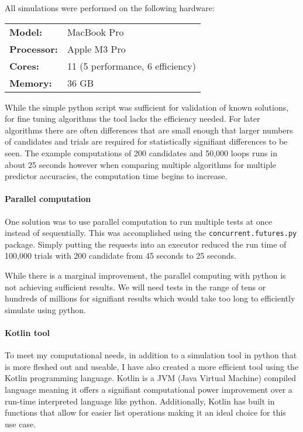 \documentclass[a4paper,11pt]{article}
\begin{document}
All simulations were performed on the following hardware:
\begin{center}
\begin{tabular}{ll}
\textbf{Model:} & MacBook Pro \\
\textbf{Processor:} & Apple M3 Pro \\
\textbf{Cores:} & 11 (5 performance, 6 efficiency) \\
\textbf{Memory:} & 36 GB
\end{tabular}
\end{center}

While the simple python script was sufficient for validation of known solutions, for fine tuning algorithms the tool lacks the efficiency needed. For later algorithms there are often differences that are small enough that larger numbers of candidates and trials are required for statistically signifiant differences to be seen. The example computations of 200 candidates and 50,000 loops runs in about 25 seconds however when comparing multiple algorithms for multiple predictor accuracies, the computation time begins to increase.

\paragraph{Parallel computation}

One solution was to use parallel computation to run multiple tests at once instead of sequentially. This was accomplished using the \verb|concurrent.futures.py| package. Simply putting the requests into an executor reduced the run time of 100,000 trials with 200 candidate from 45 seconds to 25 seconds.

While there is a marginal improvement, the parallel computing with python is not achieving sufficient results. We will need tests in the range of tens or hundreds of millions for signifiant results which would take too long to efficiently simulate using python. 
\paragraph{Kotlin tool}
To meet my computational needs, in addition to a simulation tool in python that is more fleshed out and useable, I have also created a more efficient tool using the Kotlin programming language. Kotlin is a JVM (Java Virtual Machine) compiled language meaning it offers a signifiant computational power improvement over a run-time interpreted language like python. Additionally, Kotlin has built in functions that allow for easier list operations making it an ideal choice for this use case.\cite{NathanFallet_Gildor_2025}
\end{document}
